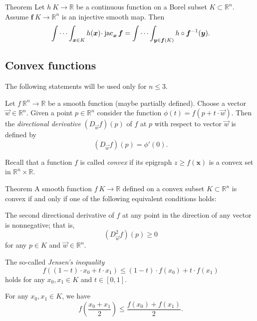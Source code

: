 \begin{thm}{Theorem}\label{thm:mult-substitution} 
Let $h\:K\to\mathbb{R}$ be a continuous function on a Borel subset $K\subset \mathbb{R}^n$.
Assume $\bm{f}\:K\to \mathbb{R}^n$ is an injective smooth map.
Then 
\[\idotsint_{\bm{x}\in K} h(\bm{x})\cdot \jac_{\bm{x}}\bm{f}
=
\idotsint_{\bm{y}\in \bm{f}(K)} h\circ \bm{f}^{-1}(\bm{y}).\]

\end{thm}

\subsection*{Convex functions}

The following statements will be used only for $n\le 3$.

Let $f\:\mathbb{R}^n\to \mathbb{R}$ be a smooth function (maybe partially defined).
Choose a vector $\vec w\in \mathbb{R}^n$.
Given a point $p\in\mathbb{R}^n$ consider the function $\phi(t)=f(p+t\cdot \vec w)$.
Then the \emph{directional derivative} $(D_{\vec w}f)(p)$ of $f$ at $p$ with respect to vector $\vec w$ is defined by
\[(D_{\vec w}f)(p)=\phi'(0).\]

Recall that a function $f$ is called \emph{convex} if 
its epigraph $z\ge f(\bm{x})$ is a convex set in $\mathbb{R}^n\times \mathbb{R}$.

\begin{thm}{Theorem}\label{thm:Jensen}
A smooth function $f\:K\to \mathbb{R}$ defined on a convex subset $K\subset\mathbb{R}^n$ is convex if and only if one of the following equivalent conditions holds:

\begin{subthm}{}
The second directional derivative of $f$ at any point in the direction of any vector is nonnegative; that is,
\[(D_{\vec w}^2f)(p)\ge 0\]
for any $p\in K$ and $\vec w\in\mathbb{R}^n$.
\end{subthm}

\begin{subthm}{}
The so-called \emph{Jensen's inequality}
\[f \left ((1-t)\cdot x_0 + t\cdot x_1 \right ) \le (1-t)\cdot f(x_0)+ t\cdot f(x_1)\]
holds for any $x_0,x_1\in K$ and $t\in[0,1]$.

\end{subthm}

\begin{subthm}{}
For any $x_0,x_1\in K$, we have 
\[f \left (\frac{x_0 + x_1}2 \right ) \le \frac{f(x_0) + f(x_1)}2.\]
\end{subthm}

\end{thm}




